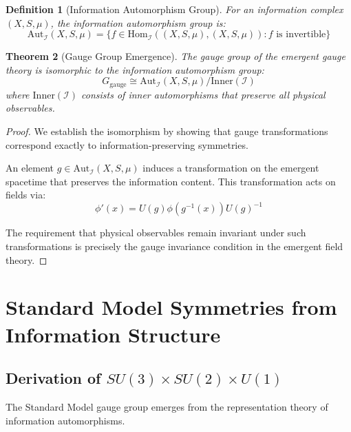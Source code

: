 \documentclass{article}
\newtheorem{theorem}{Theorem}[section]
\newtheorem{definition}[theorem]{Definition}
\begin{document}
\begin{definition}[Information Automorphism Group]
For an information complex $(X, S, \mu)$, the information automorphism group is:
\begin{equation}
\text{Aut}_{\mathcal{I}}(X, S, \mu) = \{f \in \text{Hom}_{\mathcal{I}}((X, S, \mu), (X, S, \mu)) : f \text{ is invertible}\}
\end{equation}
\end{definition}

\begin{theorem}[Gauge Group Emergence]
\label{thm:gauge_emergence}
The gauge group of the emergent gauge theory is isomorphic to the information automorphism group:
\begin{equation}
G_{\text{gauge}} \cong \text{Aut}_{\mathcal{I}}(X, S, \mu) / \text{Inner}(\mathcal{I})
\end{equation}
where $\text{Inner}(\mathcal{I})$ consists of inner automorphisms that preserve all physical observables.
\end{theorem}

\begin{proof}
We establish the isomorphism by showing that gauge transformations correspond exactly to information-preserving symmetries.

An element $g \in \text{Aut}_{\mathcal{I}}(X, S, \mu)$ induces a transformation on the emergent spacetime that preserves the information content. This transformation acts on fields via:
\begin{equation}
\phi'(x) = U(g) \phi(g^{-1}(x)) U(g)^{-1}
\end{equation}

The requirement that physical observables remain invariant under such transformations is precisely the gauge invariance condition in the emergent field theory.
\end{proof}

\section{Standard Model Symmetries from Information Structure}

\subsection{Derivation of $SU(3) \times SU(2) \times U(1)$}

The Standard Model gauge group emerges from the representation theory of information automorphisms.
\end{document}
